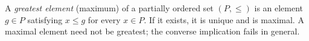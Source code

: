 
A \emph{greatest element} (maximum) of a partially ordered set $(P,\le)$ is an element $g\in P$ satisfying $x\le g$ for every $x\in P$. If it exists, it is unique and is maximal. A maximal element need not be greatest; the converse implication fails in general.
